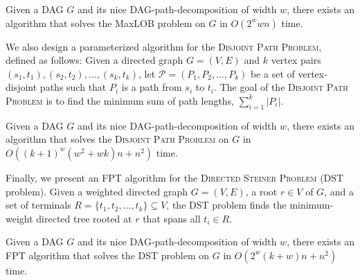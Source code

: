 \documentclass[runningheads]{llncs}
\theoremstyle{plain}
\theoremstyle{definition}
\begin{document}
\begin{theorem}\label{theorem_lob}
    Given a DAG \(G\) and its nice DAG-path-decomposition of width \(w\), there exists an algorithm that solves the MaxLOB problem on \(G\) in \(O(2^w w n)\) time.  
\end{theorem}

We also design a parameterized algorithm for the \textsc{Disjoint Path Problem}, defined as follows:  
Given a directed graph \(G = (V, E)\) and \(k\) vertex pairs \((s_1, t_1), (s_2, t_2), \dots, (s_k, t_k)\), let \(\mathcal{P} = (P_1, P_2, \dots, P_k)\) be a set of vertex-disjoint paths such that $P_i$ is a path from \(s_i\) to \(t_i\).  
The goal of the \textsc{Disjoint Path Problem} is to find the minimum sum of path lengths, \(\sum_{i=1}^{k} |P_i|\).  

\begin{theorem}\label{theorem_disjoint_path}
    Given a DAG \(G\) and its nice DAG-path-decomposition of width \(w\), there exists an algorithm that solves the \textsc{Disjoint Path Problem} on \(G\) in \(O((k+1)^w (w^2 + wk) n + n^2)\) time.  
\end{theorem}

Finally, we present an FPT algorithm for the \textsc{Directed Steiner Problem} (DST problem).  
Given a weighted directed graph \(G = (V, E)\), a root \(r \in V\) of $G$, and a set of terminals \(R = \{t_1, t_2, \dots, t_k\} \subseteq V\), the DST problem finds the minimum-weight directed tree rooted at \(r\) that spans all \(t_i \in R\).  

\begin{theorem}\label{theorem_DST}
    Given a DAG \(G\) and its nice DAG-path-decomposition of width \(w\), there exists an FPT algorithm that solves the DST problem on \(G\) in \(O(2^w (k+w) n + n^2)\) time.  
\end{theorem}
\end{document}
